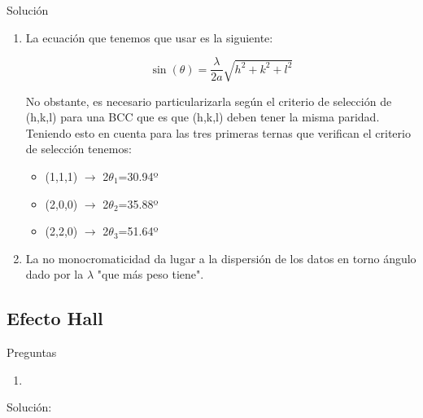 Solución

\begin{enumerate}[label=\alph*)]
	\item La ecuación que tenemos que usar es la siguiente:

	      \begin{equation}
		      \sin(\theta)=\frac{\lambda}{2a}\sqrt{h^2+k^2+l^2}
	      \end{equation}

	      No obstante, es necesario particularizarla según el criterio de selección de (h,k,l) para una BCC que es que (h,k,l) deben tener la misma paridad. Teniendo esto en cuenta para las tres primeras ternas que verifican el criterio de selección tenemos:

	      \begin{itemize}
		      \item (1,1,1) $\longrightarrow$ 2$\theta_1$=30.94º
		      \item (2,0,0) $\longrightarrow$ 2$\theta_2$=35.88º
		      \item (2,2,0) $\longrightarrow$ 2$\theta_3$=51.64º
	      \end{itemize}

	\item La no monocromaticidad da lugar a la dispersión de los datos en torno ángulo dado por la $\lambda$ "que más peso tiene".
\end{enumerate}

\vspace*{2em}

\begin{Enunciado}
	\subsection*{Efecto Hall}
	Preguntas
	\begin{enumerate}[label=\alph*)]
	\item \lipsum[1] 
	\end{enumerate}
\end{Enunciado}

Solución: 

